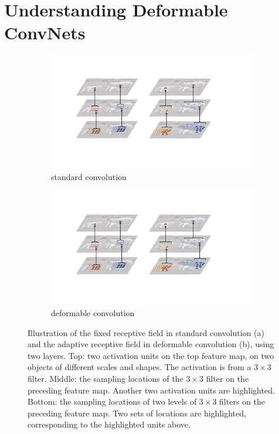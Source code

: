 \documentclass[10pt,twocolumn,letterpaper]{article}
\begin{document}
\section{Understanding Deformable ConvNets}
\label{sec.understanding}

\begin{figure}  
  \begin{subfigure}{.5\linewidth}
  \centering
  \includegraphics[width=\linewidth]{standard_conv_receptive_field_v6.pdf}
  \caption{standard convolution}
  \label{fig:dpc_ill_3}
\end{subfigure}%
\begin{subfigure}{.5\linewidth}
  \centering
  \includegraphics[width=\linewidth]{deform_conv_receptive_field_v6.pdf}
  \caption{deformable convolution}
  \label{fig:dpc_ill_4}
\end{subfigure}
\caption{Illustration of the fixed receptive field in standard convolution (a) and the adaptive receptive field in deformable convolution (b), using two layers. Top: two activation units on the top feature map, on two objects of different scales and shapes. The activation is from a $3\times 3$ filter. Middle: the sampling locations of the $3\times 3$ filter on the preceding feature map. Another two activation units are highlighted. Bottom: the sampling locations of two levels of $3\times 3$ filters on the preceding feature map. Two sets of locations are highlighted, corresponding to the highlighted units above.}
\label{fig.two_layer_receptive_field_example}
\end{figure}
\end{document}
